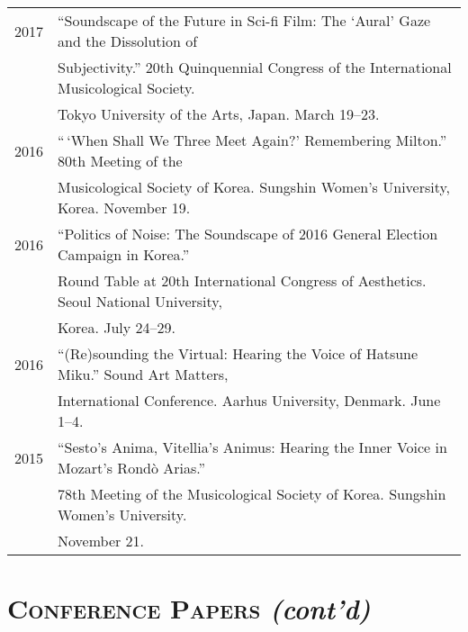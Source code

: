 \documentclass[letter,11pt,draft]{article}
\begin{document}
  \hspace*{-0.25cm}
  \begin{tabular}{p{2.5cm} p{12.5cm}}
  2017 & ``Soundscape of the Future in Sci-fi Film: The ‘Aural’ Gaze and the Dissolution of\\
  & Subjectivity.'' 20th Quinquennial Congress of the International Musicological Society.\\
  & Tokyo University of the Arts, Japan. March 19--23.\\[2mm]
  
  2016 & ``\,`When Shall We Three Meet Again?' Remembering Milton.'' 80th Meeting of the\\
  & Musicological Society of Korea. Sungshin Women's University, Korea. November 19.\\[2mm]
  
  2016 & ``Politics of Noise: The Soundscape of 2016 General Election Campaign in Korea.''\\
  & Round Table at 20th International Congress of Aesthetics. Seoul National University,\\
  & Korea. July 24--29.\\[2mm]
  
  2016 & ``(Re)sounding the Virtual: Hearing the Voice of Hatsune Miku.'' Sound Art Matters,\\
  & International Conference. Aarhus University, Denmark. June 1--4.\\[2mm]
  
  2015 & ``Sesto's Anima, Vitellia's Animus: Hearing the Inner Voice in Mozart’s Rond\`{o} Arias.''\\
  & 78th Meeting of the Musicological Society of Korea. Sungshin Women's University.\\
  & November 21.  
  \end{tabular}
  
  \section*{\textsc{Conference Papers} \textit{(cont'd)}}
  
\end{document}
